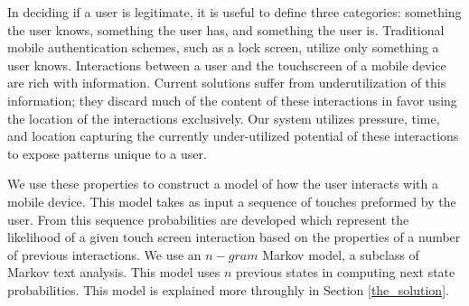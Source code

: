 In deciding if a user is legitimate,
it is useful to define three categories:
something the user knows,
something the user has, and
something the user is.
Traditional mobile authentication schemes,
such as a lock screen,
utilize only something a user knows.
Interactions between a user
and the touchscreen of a mobile device
are rich with information.
Current solutions suffer from underutilization 
of this information; 
they discard much of the content of these
interactions in favor using
the location of the interactions exclusively.
%
Our system utilizes 
pressure,
time, and
location 
capturing the currently under-utilized potential 
of these interactions to expose patterns unique to a user.

We use these properties to construct
a model of how the user interacts with a mobile device.
This model takes as input a sequence of touches preformed
by the user.
From this sequence
probabilities are developed
which represent the likelihood of a given touch screen interaction
based on the properties of a number of previous interactions.
%
We use an $n-gram$ Markov model,
a subclass of Markov text analysis.
This model uses $n$ previous states
in computing next state probabilities.
This model is explained more throughly in
Section \ref{the_solution}. %





